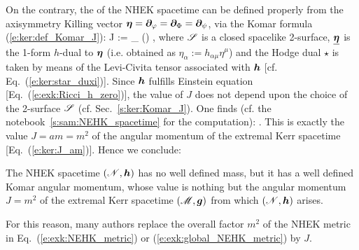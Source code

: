 On the contrary, the
 of the NHEK spacetime can be defined
properly from the axisymmetry Killing vector
$\bm{\eta} = \bm{\partial}_{\varphi} = \bm{\partial}_{\Phi} = \bm{\partial}_{\psi}$, via
the Komar formula (\ref{e:ker:def_Komar_J}):
\be
     J :=  \int_{\Sp} \star(\dd \uu{\eta})  ,
\ee
where $\mathscr{S}$ is a closed spacelike 2-surface, $\underline{\bm{\eta}}$ is the 1-form $h$-dual to $\bm{\eta}$ (i.e. obtained as $\eta_\alpha := h_{\alpha\mu} \eta^\mu$)
and the Hodge dual $\star$
is taken by means of the Levi-Civita tensor associated with $\bm{h}$ [cf. Eq.~(\ref{e:ker:star_duxi})].
Since $\bm{h}$ fulfills Einstein equation [Eq.~(\ref{e:exk:Ricci_h_zero})], the value
of $J$ does not depend upon the choice of the 2-surface $\mathscr{S}$ (cf. Sec.~\ref{s:ker:Komar_J}).
One finds (cf. the notebook~\ref{s:sam:NEHK_spacetime} for the computation):
\be
     .
\ee
This is exactly the value $J = a m = m^2$ of the angular momentum of the
extremal Kerr spacetime [Eq.~(\ref{e:ker:J_am})]. Hence we conclude:
\begin{prop}
The NHEK spacetime $(\mathscr{N},\bm{h})$ has no well defined mass, but it has a well defined
Komar angular momentum, whose value is nothing but the angular momentum $J = m^2$
of the extremal Kerr spacetime $(\mathscr{M},\bm{g})$ from which $(\mathscr{N},\bm{h})$ arises.
\end{prop}

\begin{remark}
For this reason, many authors replace the overall factor $m^2$ of the NHEK metric
in Eq.~(\ref{e:exk:NEHK_metric}) or (\ref{e:exk:global_NEHK_metric}) by $J$.
\end{remark}


